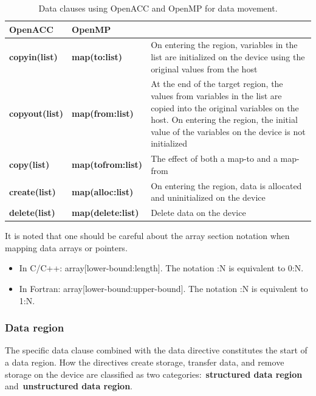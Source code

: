\begin{table}[!h]
\centering\caption{Data clauses using OpenACC and OpenMP for data movement.}\label{tbl:data_clauses_openacc_openmp}
\begin{tabular}{ | p{} | p{} | p{} | } 
\hline
\textbf{OpenACC} & \textbf{OpenMP} & \\
\hline
\textbf{copyin(list)} & \textbf{map(to:list)} & On entering the region, variables in the list are initialized on the device using the original values from the host\\
\textbf{copyout(list)} & \textbf{map(from:list)} & At the end of the target region, the values from variables in the list are copied into the original variables on the host. On entering the region, the initial value of the variables on the device is not initialized \\
\textbf{copy(list)} & \textbf{map(tofrom:list)} & The effect of both a map-to and a map-from \\
\textbf{create(list)} & \textbf{map(alloc:list)} & On entering the region, data is allocated and uninitialized on the device \\
\textbf{delete(list)} & \textbf{map(delete:list)} & Delete data on the device \\
\hline
\end{tabular}
\end{table}


\par
It is noted that one should be careful about the array section notation when mapping data arrays or pointers.
\begin{itemize}
    \item In C/C++: array[lower-bound:length]. The notation :N is equivalent to 0:N.
    \item In Fortran: array[lower-bound:upper-bound]. The notation :N is equivalent to 1:N.
\end{itemize}


\subsubsection{Data region}


\par
The specific data clause combined with the data directive constitutes the start of a data region.
How the directives create storage, transfer data, and remove storage on the device are classified as two categories:~\textbf{structured data region} and~\textbf{unstructured data region}.


